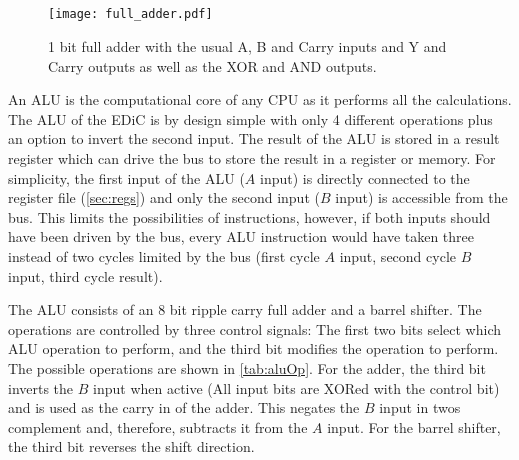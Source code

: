 \subsection{}\label{sec:alu}
\begin{figure}[t]
  \centering
  \texttt{[image: full\_adder.pdf]}
  \caption{1 bit full adder with the usual A, B and Carry inputs and Y and Carry outputs as well as the XOR and AND outputs.}
  \label{fig:full_adder}
\end{figure}
An \gls{ALU} is the computational core of any \gls{CPU} as it performs all the calculations.
The \gls{ALU} of the \gls{EDiC} is by design simple with only 4 different operations plus an option to invert the second input.
The result of the \gls{ALU} is stored in a result register which can drive the bus to store the result in a register or memory.
For simplicity, the first input of the \gls{ALU} ($A$ input) is directly connected to the register file (\cref{sec:regs}) and only the second input ($B$ input) is accessible from the bus.
This limits the possibilities of instructions, however, if both inputs should have been driven by the bus, every \gls{ALU} instruction would have taken three instead of two cycles limited by the bus (first cycle $A$ input, second cycle $B$ input, third cycle result).

The \gls{ALU} consists of an 8 bit ripple carry full adder and a barrel shifter.
The operations are controlled by three control signals: The first two bits select which \gls{ALU} operation to perform, and the third bit modifies the operation to perform.
The possible operations are shown in \cref{tab:aluOp}.
For the adder, the third bit inverts the $B$ input when active (All input bits are XORed with the control bit) and is used as the carry in of the adder.
This negates the $B$ input in twos complement and, therefore, subtracts it from the $A$ input.
For the barrel shifter, the third bit reverses the shift direction.

